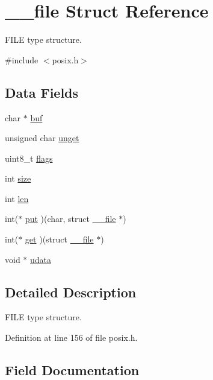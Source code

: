 \hypertarget{struct____file}{}\section{\+\_\+\+\_\+file Struct Reference}
\label{struct____file}


F\+I\+LE type structure.  




{\ttfamily \#include $<$posix.\+h$>$}

\subsection*{Data Fields}
\begin{DoxyCompactItemize}
\item 
char $\ast$ \hyperlink{struct____file_a3e5a85ae919a90efbb7cb44ccb54fe46}{buf}
\item 
unsigned char \hyperlink{struct____file_a1d139ae3cb11a1fada469a49f7d3d3b6}{unget}
\item 
uint8\+\_\+t \hyperlink{struct____file_a8d11df8679502efee09740f97d7c277b}{flags}
\item 
int \hyperlink{struct____file_aff4a1ca8b6a12460812928afae81248d}{size}
\item 
int \hyperlink{struct____file_a30309efd13a75ed510bb2370debafaf8}{len}
\item 
int($\ast$ \hyperlink{struct____file_a01c8b217e42cc11b6a7f8429114e9d46}{put} )(char, struct \hyperlink{struct____file}{\+\_\+\+\_\+file} $\ast$)
\item 
int($\ast$ \hyperlink{struct____file_a2d816b077c3af0425344fe4b283dad33}{get} )(struct \hyperlink{struct____file}{\+\_\+\+\_\+file} $\ast$)
\item 
void $\ast$ \hyperlink{struct____file_abe6f3bdb4df4119277132eb3e13a4628}{udata}
\end{DoxyCompactItemize}


\subsection{Detailed Description}
F\+I\+LE type structure. 

Definition at line 156 of file posix.\+h.



\subsection{Field Documentation}
